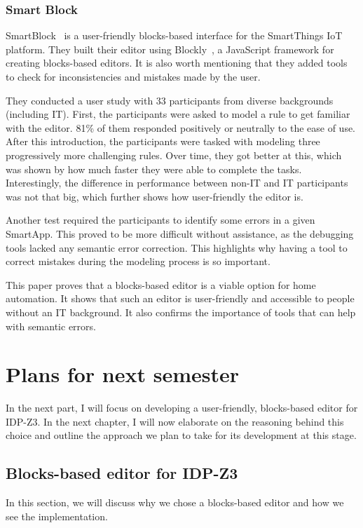 \documentclass[11pt,a4paper]{report}
\begin{document}
\subsection{Smart Block}
\label{SmartBlock}
SmartBlock~\cite{SOTA_SmartBlock} is a user-friendly blocks-based interface for the SmartThings IoT platform. They built their editor using Blockly~\cite{Blockly}, a JavaScript framework for creating blocks-based editors. It is also worth mentioning that they added tools to check for inconsistencies and mistakes made by the user.

They conducted a user study with 33 participants from diverse backgrounds (including IT). First, the participants were asked to model a rule to get familiar with the editor. 81\% of them responded positively or neutrally to the ease of use. After this introduction, the participants were tasked with modeling three progressively more challenging rules. Over time, they got better at this, which was shown by how much faster they were able to complete the tasks. Interestingly, the difference in performance between non-IT and IT participants was not that big, which further shows how user-friendly the editor is.

Another test required the participants to identify some errors in a given SmartApp. This proved to be more difficult without assistance, as the debugging tools lacked any semantic error correction. This highlights why having a tool to correct mistakes during the modeling process is so important.

This paper proves that a blocks-based editor is a viable option for home automation. It shows that such an editor is user-friendly and accessible to people without an IT background. It also confirms the importance of tools that can help with semantic errors.


\chapter{Plans for next semester}
In the next part, I will focus on developing a user-friendly, blocks-based editor for IDP-Z3. In the next chapter, I will now elaborate on the reasoning behind this choice and outline the approach we plan to take for its development at this stage.

\section{Blocks-based editor for IDP-Z3}
In this section, we will discuss why we chose a blocks-based editor and how we see the implementation.
\end{document}
